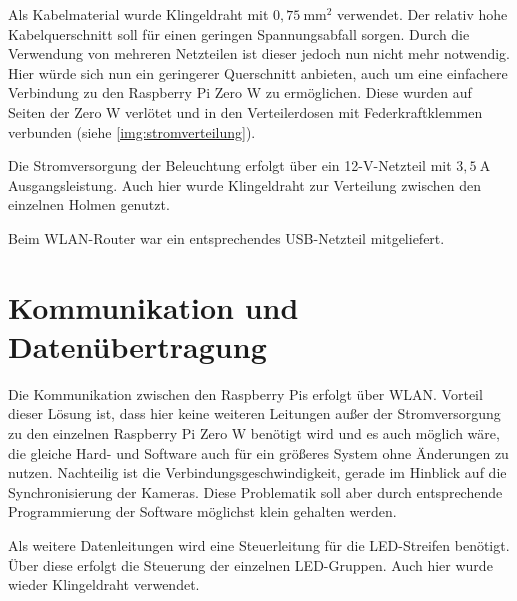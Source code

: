 \documentclass[./00PhotoBox.tex]{subfiles}
\begin{document}
Als Kabelmaterial wurde Klingeldraht mit $0,75~\text{mm}^2$ verwendet. Der relativ hohe Kabelquerschnitt soll für einen geringen Spannungsabfall sorgen. Durch die Verwendung von mehreren Netzteilen ist dieser jedoch nun nicht mehr notwendig. Hier würde sich nun ein geringerer Querschnitt anbieten, auch um eine einfachere Verbindung zu den Raspberry Pi Zero W zu ermöglichen. Diese wurden auf Seiten der Zero W verlötet und in den Verteilerdosen mit Federkraftklemmen verbunden (siehe \autoref{img:stromverteilung}).

Die Stromversorgung der Beleuchtung erfolgt über ein 12-V-Netzteil mit $3,5~\text{A}$ Ausgangsleistung. Auch hier wurde Klingeldraht zur Verteilung zwischen den einzelnen Holmen genutzt.

Beim WLAN-Router war ein entsprechendes USB-Netzteil mitgeliefert.

\section{Kommunikation und Datenübertragung}
Die Kommunikation zwischen den Raspberry Pis erfolgt über WLAN. Vorteil dieser Lösung ist, dass hier keine weiteren Leitungen außer der Stromversorgung zu den einzelnen Raspberry Pi Zero W benötigt wird und es auch möglich wäre, die gleiche Hard- und Software auch für ein größeres System ohne Änderungen zu nutzen. Nachteilig ist die Verbindungsgeschwindigkeit, gerade im Hinblick auf die Synchronisierung der Kameras. Diese Problematik soll aber durch entsprechende Programmierung der Software möglichst klein gehalten werden.

Als weitere Datenleitungen wird eine Steuerleitung für die LED-Streifen benötigt. Über diese erfolgt die Steuerung der einzelnen LED-Gruppen. Auch hier wurde wieder Klingeldraht verwendet.

\biblio
\end{document}
